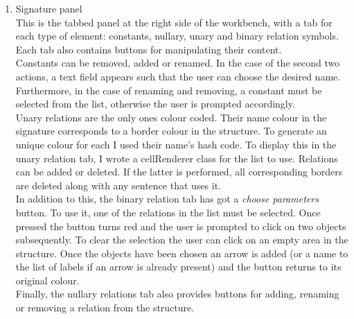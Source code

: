 \documentclass{report}
\begin{document}
\begin{enumerate}
\item Signature panel \\
This is the tabbed panel at the right side of the workbench, with a tab for each 
type of element: constants, nullary, unary and binary relation symbols. Each 
tab also contains buttons for manipulating their content.\\
Constants can be removed, added or renamed. In the case of the second two 
actions, a text field appears such that the user can choose the desired name. 
Furthermore, in the case of renaming and removing, a constant must be selected 
from the list, otherwise the user is prompted accordingly. \\
Unary relations are the only ones colour coded. Their name colour in the 
signature corresponds to a border colour in the structure. To generate an unique 
colour for each I used their name's hash code. To display this in the unary 
relation tab, I wrote a cellRenderer class for the list to use. Relations can be 
added or deleted. If the latter is performed, all corresponding borders are 
deleted along with any sentence that uses it. \\
In addition to this, the binary relation tab has got a \emph{choose parameters} 
button. To use it, one of the relations in the list must be selected. Once 
pressed the button turns red and the user is prompted to click on two objects 
subsequently. To clear the selection the user can click on an empty area in the 
structure. Once the objects have been chosen an arrow is added (or a name to the 
list of labels if an arrow is already present) and the button returns to its 
original colour. \\
Finally, the nullary relations tab also provides buttons for adding, renaming or 
removing a relation from the structure.


\end{enumerate}
\end{document}
